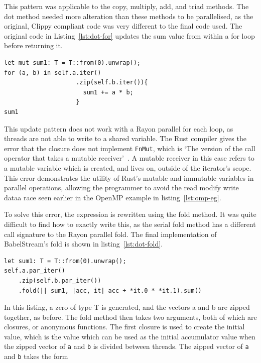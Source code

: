 This pattern was applicable to the copy, multiply, add, and triad methods. The dot method needed more alteration than these methods to be parallelised, as the original, Clippy compliant code was very different to the final code used. The original code in Listing~\ref{lst:dot-for} updates the sum value from within a for loop before returning it.
\begin{code}
\begin{verbatim}
let mut sum1: T = T::from(0).unwrap();
for (a, b) in self.a.iter()
                    .zip(self.b.iter()){
                      sum1 += a * b;
                    }
sum1
\end{verbatim}
\label{lst:dot-for}
\end{code}
This update pattern does not work with a Rayon parallel for each loop, as threads are not able to write to a shared variable. The Rust compiler gives the error that the closure does not implement \texttt{FnMut}, which is `The version of the call operator that takes a mutable receiver'~\cite{rust-doc-fnmut}. A mutable receiver in this case refers to a mutable variable which is created, and lives on, outside of the iterator's scope. This error demonstrates the utility of Rust's mutable and immutable variables in parallel operations, allowing the programmer to avoid the read modify write dataa race seen earlier in the OpenMP example in listing~\ref{lst:omp-eg}.

To solve this error, the expression is rewritten using the fold method. It was quite difficult to find how to exactly write this, as the serial fold method has a different call signature to the Rayon parallel fold. The final implementation of BabelStream's fold is shown in listing~\ref{lst:dot-fold}.
\begin{code}
\begin{verbatim}
let sum1: T = T::from(0).unwrap();
self.a.par_iter()
    .zip(self.b.par_iter())
    .fold(|| sum1, |acc, it| acc + *it.0 * *it.1).sum()
\end{verbatim}
\label{lst:dot-fold}
\end{code}
In this listing, a zero of type T is generated, and the vectors a and b are zipped together, as before. The fold method then takes two arguments, both of which are closures, or anonymous functions. The first closure is used to create the initial value, which is the value which can be used as the initial accumulator value when the zipped vector of \texttt{a} and \texttt{b} is divided between threads. The zipped vector of \texttt{a} and \texttt{b} takes the form

